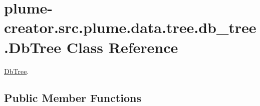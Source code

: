 \hypertarget{classplume-creator_1_1src_1_1plume_1_1data_1_1tree_1_1db__tree_1_1_db_tree}{}\section{plume-\/creator.src.\+plume.\+data.\+tree.\+db\+\_\+tree.\+Db\+Tree Class Reference}
\label{classplume-creator_1_1src_1_1plume_1_1data_1_1tree_1_1db__tree_1_1_db_tree}


\hyperlink{classplume-creator_1_1src_1_1plume_1_1data_1_1tree_1_1db__tree_1_1_db_tree}{Db\+Tree}.  


\subsection*{Public Member Functions}
